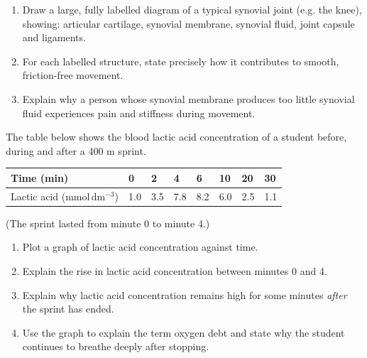 \documentclass[11pt]{article}
\newcommand{\cle}[1]{{\popxbold\color{popdark}#1}}
\newcounter{popsec}
\newcounter{popsub}
\newcommand{\courssub}[1]{%
  \stepcounter{popsub}%
  \par\vspace{9pt}\noindent{\popxbold\fontsize{11.5}{13}\selectfont\color{popink}{\color{poporange}\thepopsec.\thepopsub}\hspace{6pt}#1}\par\nopagebreak\vspace{4pt}
}
\begin{document}
\begin{exercice}
\begin{enumerate}
\item Draw a large, fully labelled diagram of a typical synovial joint (e.g. the knee), showing: articular cartilage, synovial membrane, synovial fluid, joint capsule and ligaments.
\item For each labelled structure, state precisely how it contributes to smooth, friction-free movement.
\item Explain why a person whose synovial membrane produces too little synovial fluid experiences pain and stiffness during movement.
\end{enumerate}
\end{exercice}

\begin{exercice}
The table below shows the blood lactic acid concentration of a student before, during and after a 400 m sprint.
\begin{center}
\begin{tabularx}{\linewidth}{|l|X|X|X|X|X|X|X|}
\hline
\rowcolor{popblueL} Time (min) & 0 & 2 & 4 & 6 & 10 & 20 & 30 \\
\hline
Lactic acid ($\mathrm{mmol\,dm^{-3}}$) & 1.0 & 3.5 & 7.8 & 8.2 & 6.0 & 2.5 & 1.1 \\
\hline
\end{tabularx}
\end{center}
(The sprint lasted from minute 0 to minute 4.)
\begin{enumerate}
\item Plot a graph of lactic acid concentration against time.
\item Explain the rise in lactic acid concentration between minutes 0 and 4.
\item Explain why lactic acid concentration remains high for some minutes \emph{after} the sprint has ended.
\item Use the graph to explain the term \cle{oxygen debt} and state why the student continues to breathe deeply after stopping.
\end{enumerate}
\end{exercice}

\courssub{I prepare for the GCE}
\end{document}
